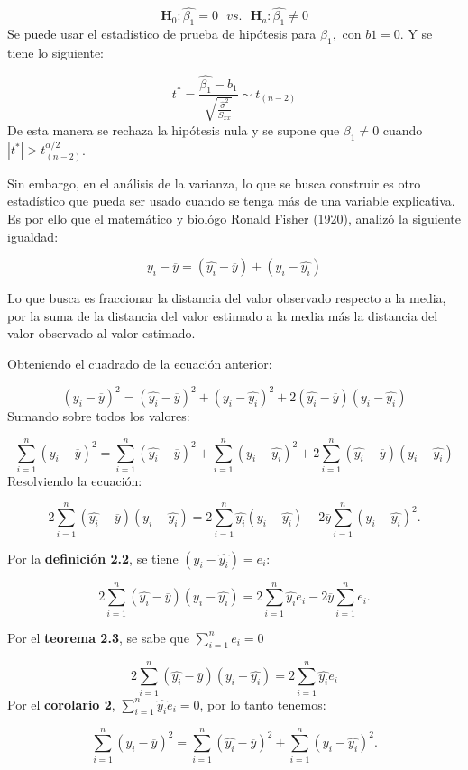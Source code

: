 \documentclass[
  a4paper,
  oneside,
  openany]{book}
\begin{document}
\[\textbf{H}_0:\hat{\beta_{1}}=0 \ \ \ vs. \ \ \ \textbf{H}_a:\hat{\beta_{1}} \neq 0\]
Se puede usar el estadístico de prueba de hipótesis para \(\beta_{1},\) con \(b1=0\). Y se tiene lo siguiente:

\[t^*=\frac{\hat{\beta_{1}}-b_{1}}{\sqrt{\frac{\hat{\sigma}^2}{S_{xx}}}} \sim t_{(n-2)}\]
De esta manera se rechaza la hipótesis nula y se supone que \(\beta_{1}\neq 0\) cuando \(|t^*|>t^{\alpha/2}_{(n-2)}\).

Sin embargo, en el análisis de la varianza, lo que se busca construir es otro estadístico que pueda ser usado cuando se tenga más de una variable explicativa. Es por ello que el matemático y biológo Ronald Fisher (1920), analizó la siguiente igualdad:

\[y_{i}-\overline{y}=(\hat{y_{i}}-\overline{y})+(y_{i}-\hat{y_{i}})\]

Lo que busca es fraccionar la distancia del valor observado respecto a la media, por la suma de la distancia del valor estimado a la media más la distancia del valor observado al valor estimado.

Obteniendo el cuadrado de la ecuación anterior:

\[(y_{i}-\overline{y})^2=(\hat{y_{i}}-\overline{y})^2+(y_{i}-\hat{y_{i}})^2+2(\hat{y_{i}}-\overline{y})(y_{i}-\hat{y_{i}})\]
Sumando sobre todos los valores:

\[\sum_{i=1}^{n}(y_{i}-\overline{y})^2=\sum_{i=1}^{n}(\hat{y_{i}}-\overline{y})^2+\sum_{i=1}^{n}(y_{i}-\hat{y_{i}})^2+2\sum_{i=1}^{n}(\hat{y_{i}}-\overline{y})(y_{i}-\hat{y_{i}})\]
Resolviendo la ecuación:

\[2\sum_{i=1}^{n}(\hat{y_{i}}-\overline{y})(y_{i}-\hat{y_{i}})=2\sum_{i=1}^{n}\hat{y_{i}}(y_{i}-\hat{y_{i}})-2\overline{y}\sum_{i=1}^{n}(y_{i}-\hat{y_{i}})^2.\]

Por la \textbf{definición 2.2}, se tiene \((y_{i}-\hat{y_{i}})=e_{i}\):

\[2\sum_{i=1}^{n}(\hat{y_{i}}-\overline{y})(y_{i}-\hat{y_{i}})=2\sum_{i=1}^{n}\hat{y_{i}}e_{i}-2\overline{y}\sum_{i=1}^{n}e_{i}.\]

Por el \textbf{teorema 2.3}, se sabe que \(\sum_{i=1}^{n}e_{i}=0\)

\[2\sum_{i=1}^{n}(\hat{y_{i}}-\overline{y})(y_{i}-\hat{y_{i}})=2\sum_{i=1}^{n}\hat{y_{i}}e_{i}\]
Por el \textbf{corolario 2}, \(\sum_{i=1}^{n}\hat{y_{i}}e_{i}=0\), por lo tanto tenemos:

\[\sum_{i=1}^{n}(y_{i}-\overline{y})^2=\sum_{i=1}^{n}(\hat{y_{i}}-\overline{y})^2+\sum_{i=1}^{n}(y_{i}-\hat{y_{i}})^2.\]
\end{document}
